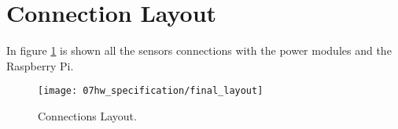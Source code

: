 \clearpage
\section{Connection Layout} %
In figure \ref{fig:connLayout} is shown all the sensors connections with the power modules and the Raspberry Pi.

\begin{figure}[H]
	\centering
	\texttt{[image: 07hw\_specification/final\_layout]}
	\caption{Connections Layout.}
	\label{fig:connLayout}
\end{figure}